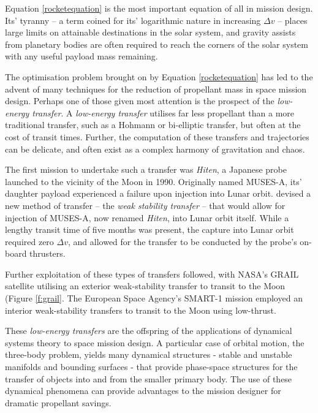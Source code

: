 \begin{multicols*}{2}
Equation \ref{rocketequation} is the most important equation of all in mission design. Its' tyranny -- a term coined for its' logarithmic nature in increasing $\Delta v$ -- places large limits on attainable destinations in the solar system, and gravity assists from planetary bodies are often required to reach the corners of the solar system with any useful payload mass remaining.

The optimisation problem brought on by Equation \ref{rocketequation} has led to the advent of many techniques for the reduction of propellant mass in space mission design. Perhaps one of those given most attention is the prospect of the \textit{low-energy transfer}. A \textit{low-energy transfer} utilises far less propellant than a more traditional transfer, such as a Hohmann or bi-elliptic transfer, but often at the cost of transit times. Further, the computation of these transfers and trajectories can be delicate, and often exist as a complex harmony of gravitation and chaos. 

The first mission to undertake such a transfer was \textit{Hiten}, a Japanese probe launched to the vicinity of the Moon in 1990. Originally named MUSES-A, its' daughter payload experienced a failure upon injection into Lunar orbit. \citep{Belbruno1993} devised a new method of transfer -- the \textit{weak stability transfer} -- that would allow for injection of MUSES-A, now renamed \textit{Hiten}, into Lunar orbit itself. While a lengthy transit time of five months was present, the capture into Lunar orbit required zero $\Delta v$, and allowed for the transfer to be conducted by the probe's on-board thrusters.

Further exploitation of these types of transfers followed, with NASA's GRAIL satellite utilising an exterior weak-stability transfer to transit to the Moon (Figure \ref{f:grail}. The European Space Agency's SMART-1 mission employed an interior weak-stability transfers to transit to the Moon using low-thrust.

These \textit{low-energy transfers} are the offspring of the applications of dynamical systems theory to space mission design. A particular case of orbital motion, the three-body problem, yields many dynamical structures - stable and unstable manifolds and bounding surfaces - that provide phase-space structures for the transfer of objects into and from the smaller primary body. The use of these dynamical phenomena can provide advantages to the mission designer for dramatic propellant savings.


\end{multicols*}
